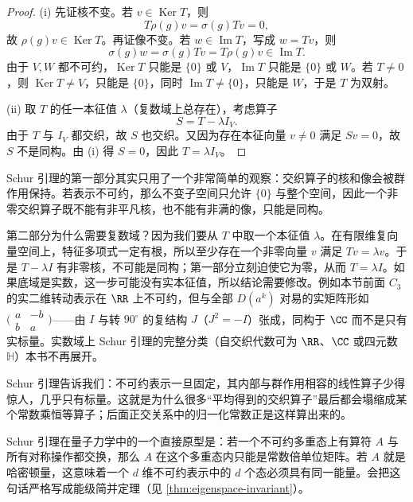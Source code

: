 \begin{proof}
(i) 先证核不变。若 $v\in \operatorname{Ker} T$，则
\[
T\rho(g)v=\sigma(g)Tv=0,
\]
故 $\rho(g)v\in\operatorname{Ker} T$。再证像不变。若 $w\in\operatorname{Im} T$，写成 $w=Tv$，则
\[
\sigma(g)w=\sigma(g)Tv=T\rho(g)v\in\operatorname{Im} T.
\]
由于 $V,W$ 都不可约，$\operatorname{Ker} T$ 只能是 $\{0\}$ 或 $V$，$\operatorname{Im} T$ 只能是 $\{0\}$ 或 $W$。若 $T\neq 0$，则 $\operatorname{Ker} T\neq V$，只能是 $\{0\}$，同时 $\operatorname{Im} T\neq\{0\}$，只能是 $W$，于是 $T$ 为双射。

(ii) 取 $T$ 的任一本征值 $\lambda$（复数域上总存在），考虑算子
\[
S=T-\lambda I_V.
\]
由于 $T$ 与 $I_V$ 都交织，故 $S$ 也交织。又因为存在本征向量 $v\neq 0$ 满足 $Sv=0$，故 $S$ 不是同构。由 (i) 得 $S=0$，因此 $T=\lambda I_V$。
\end{proof}

Schur 引理的第一部分其实只用了一个非常简单的观察：交织算子的核和像会被群作用保持。若表示不可约，那么不变子空间只允许 $\{0\}$ 与整个空间，因此一个非零交织算子既不能有非平凡核，也不能有非满的像，只能是同构。

第二部分为什么需要复数域？因为我们要从 $T$ 中取一个本征值 $\lambda$。在有限维复向量空间上，特征多项式一定有根，所以至少存在一个非零向量 $v$ 满足 $Tv=\lambda v$。于是 $T-\lambda I$ 有非零核，不可能是同构；第一部分立刻迫使它为零，从而 $T=\lambda I$。如果底域是实数，这一步可能没有实本征值，所以结论需要修改。例如本节前面 $C_3$ 的实二维转动表示在 $\RR$ 上不可约，但与全部 $D(a^k)$ 对易的实矩阵形如 $\bigl(\begin{smallmatrix}a&-b\\b&a\end{smallmatrix}\bigr)$——由 $I$ 与转 $90^\circ$ 的复结构 $J$（$J^2=-I$）张成，同构于 $\CC$ 而不是只有实标量。实数域上 Schur 引理的完整分类（自交织代数可为 $\RR$、$\CC$ 或四元数 $\mathbb H$）本书不再展开。


Schur 引理告诉我们：不可约表示一旦固定，其内部与群作用相容的线性算子少得惊人，几乎只有标量。这就是为什么很多“平均得到的交织算子”最后都会塌缩成某个常数乘恒等算子；后面正交关系中的归一化常数正是这样算出来的。

Schur 引理在量子力学中的一个直接原型是：若一个不可约多重态上有算符 $A$ 与所有对称操作都交换，那么 $A$ 在这个多重态内只能是常数倍单位矩阵。若 $A$ 就是哈密顿量，这意味着一个 $d$ 维不可约表示中的 $d$ 个态必须具有同一能量。会把这句话严格写成能级简并定理（见 \cref{thm:eigenspace-invariant}）。
